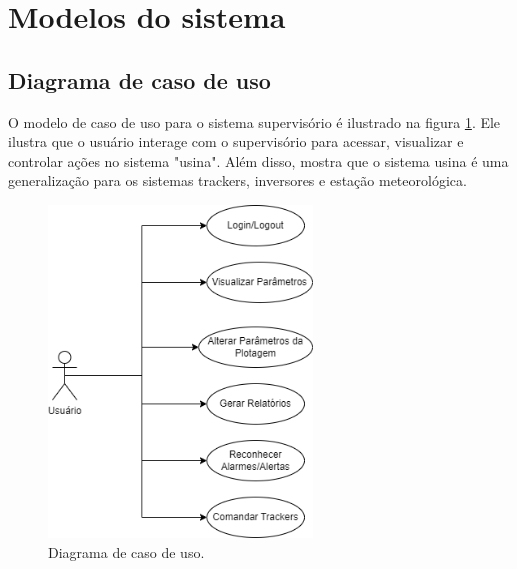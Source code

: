 \documentclass[a4paper,12pt]{article}
\begin{document}
\section {Modelos do sistema}
\subsection{Diagrama de caso de uso}

O modelo de caso de uso para o sistema supervisório é ilustrado na figura \ref{fig: caso de uso}. Ele ilustra que o usuário interage com o supervisório para acessar, visualizar e controlar ações no sistema "usina". Além disso, mostra que o sistema usina é uma generalização para os sistemas trackers, inversores e estação meteorológica.
\begin{figure} [htbp]
    \centering
    \includegraphics[width=7cm]{Imagem/Diagrama _caso_uso.png}
    \caption{Diagrama de caso de uso.}
    \label{fig: caso de uso}
\end{figure}
\end{document}

